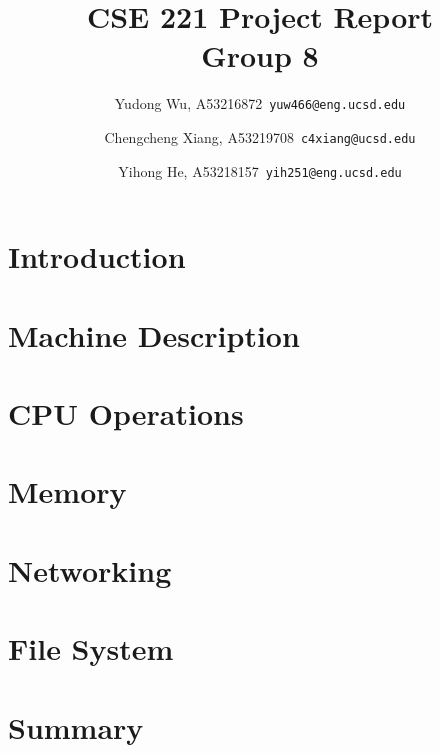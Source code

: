 \documentclass{article}
\begin{document}

\setlength{\parskip}{1em}


\title{CSE 221 Project Report \\
        \large Group 8}

\author{
        Yudong Wu, A53216872\ \texttt{yuw466@eng.ucsd.edu}
        \and
        Chengcheng Xiang, A53219708\ \texttt{c4xiang@ucsd.edu}
        \and
        Yihong He, A53218157\ \texttt{yih251@eng.ucsd.edu}
}

\maketitle

\lstset{
    numbers=left,
    numberstyle=\footnotesize,
    stepnumber=1,
    numbersep=5pt,
    basicstyle=\footnotesize,
    frame=single,
    tabsize=2,
    breaklines=true,
    xleftmargin=2em,
    xrightmargin=2em,
}

\section{Introduction}




\section{Machine Description}



\section{CPU Operations}


\section{Memory}


\section{Networking}


\section{File System}


\section{Summary}



\printbibliography
\end{document}
